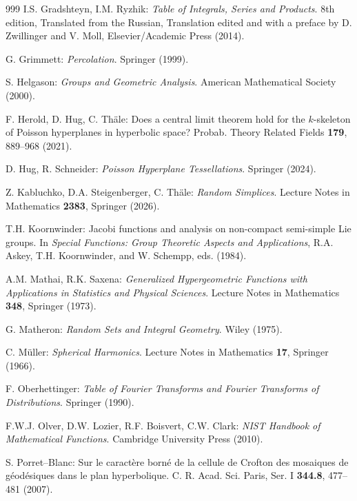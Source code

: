 \documentclass[11pt,a4paper]{article}
\theoremstyle{plain}
\theoremstyle{definition}
\theoremstyle{remark}
\begin{document}
\begin{thebibliography}{999}
		I.S. Gradshteyn, I.M. Ryzhik: \textit{Table of Integrals, Series and Products}. 8th edition, Translated from the Russian, Translation edited and with a preface by D. Zwillinger and V. Moll, Elsevier/Academic Press (2014).

        G. Grimmett: \textit{Percolation}. Springer (1999).

		S. Helgason: \textit{Groups and Geometric Analysis}. American Mathematical Society (2000).

        F. Herold, D. Hug, C. Th\"ale: Does a central limit theorem hold for the $k$-skeleton of Poisson hyperplanes in hyperbolic space? Probab. Theory Related Fields \textbf{179}, 889--968 (2021).
        
		D. Hug, R. Schneider: \textit{Poisson Hyperplane Tessellations}. Springer (2024).

        Z. Kabluchko, D.A. Steigenberger, C. Th\"ale: \textit{Random Simplices}. Lecture Notes in Mathematics \textbf{2383}, Springer (2026).
        
        T.H. Koornwinder: Jacobi functions and analysis on non-compact semi-simple Lie groups. In \textit{Special Functions: Group Theoretic Aspects and
        Applications}, R.A. Askey, T.H. Koornwinder, and W. Schempp, eds. (1984).
        
		A.M. Mathai, R.K. Saxena: \textit{Generalized Hypergeometric Functions with Applications in Statistics and Physical Sciences}. Lecture Notes in Mathematics \textbf{348}, Springer (1973).
		
		G. Matheron: \textit{Random Sets and Integral Geometry}. Wiley (1975).

        C. M\"uller: \textit{Spherical Harmonics}. Lecture Notes in Mathematics \textbf{17}, Springer (1966).
        
		F. Oberhettinger: \textit{Table of Fourier Transforms and Fourier Transforms of Distributions}. Springer (1990).
		
        F.W.J. Olver, D.W. Lozier, R.F. Boisvert, C.W. Clark: \textit{NIST Handbook of Mathematical Functions}. Cambridge University Press (2010).

        S. Porret--Blanc: Sur le caract\`ere born\'e de la cellule de Crofton des mosaiques de g\'eod\'esiques dans le plan hyperbolique. C. R. Acad. Sci. Paris, Ser. I \textbf{344.8}, 477--481 (2007).


\end{thebibliography}
\end{document}
